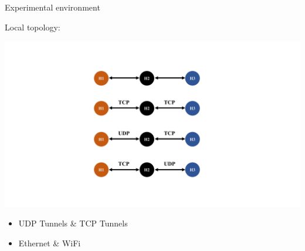 





\begin{frame}{Experimental environment}

Local topology:

\includegraphics[width=\linewidth]{../figs/Figure_3.pdf}

\begin{itemize}
\item UDP Tunnels \& TCP Tunnels
\item Ethernet \& WiFi
\end{itemize}

\end{frame}


